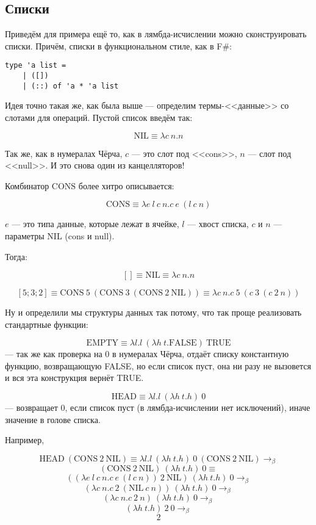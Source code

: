 \documentclass[a5paper]{article}
\begin{document}
\subsection{Списки}

Приведём для примера ещё то, как в лямбда-исчислении можно сконструировать списки. Причём, списки в функциональном стиле, как в F\#:

\begin{verbatim}
type 'a list =
    | ([])
    | (::) of 'a * 'a list
\end{verbatim}

Идея точно такая же, как была выше --- определим термы-<<данные>> со слотами для операций. Пустой список введём так:

$$\mbox{NIL} \equiv \lambda c\ n.n$$

Так же, как в нумералах Чёрча, $c$ --- это слот под <<cons>>, $n$ --- слот под <<null>>. И это снова один из канцелляторов!

Комбинатор $\mbox{CONS}$ более хитро описывается: 

$$\mbox{CONS} \equiv \lambda e\ l\ c\ n.c\ e\ (l\ c\ n)$$

$e$ --- это типа данные, которые лежат в ячейке, $l$ --- хвост списка, $c$ и $n$ --- параметры NIL (cons и null).

Тогда:

$$[] \equiv \mbox{NIL} \equiv \lambda c\ n.n$$

$$[5; 3; 2] \equiv \mbox{CONS}\ 5\ (\mbox{CONS}\ 3\ (\mbox{CONS}\ 2\ \mbox{NIL})) \equiv \lambda c\ n.c\ 5\ (c\ 3\ (c\ 2\ n))$$

Ну и определили мы структуры данных так потому, что так проще реализовать стандартные функции:

$$\mbox{EMPTY} \equiv \lambda l.l\ (\lambda h\ t.\mbox{FALSE})\ \mbox{TRUE}$$
--- так же как проверка на 0 в нумералах Чёрча, отдаёт списку константную функцию, возвращающую FALSE, но если список пуст, она ни разу не вызовется и вся эта конструкция вернёт TRUE.

$$\mbox{HEAD} \equiv \lambda l.l\ (\lambda h\ t.h)\ 0$$
--- возвращает 0, если список пуст (в лямбда-исчислении нет исключений), иначе значение в голове списка.

Например,

$$\mbox{HEAD}\ (\mbox{CONS}\ 2\ \mbox{NIL}) \equiv \lambda l.l\ (\lambda h\ t.h)\ 0\ (\mbox{CONS}\ 2\ \mbox{NIL}) \rightarrow_\beta$$
$$    (\mbox{CONS}\ 2\ \mbox{NIL})\ (\lambda h\ t.h)\ 0 \equiv$$
$$    ((\lambda e\ l\ c\ n.c\ e\ (l\ c\ n))\ 2\ \mbox{NIL})\ (\lambda h\ t.h)\ 0 \rightarrow_\beta$$
$$    (\lambda c\ n.c\ 2\ (\mbox{NIL}\ c\ n))\ (\lambda h\ t.h)\ 0 \rightarrow_\beta$$
$$    (\lambda c\ n.c\ 2\ n)\ (\lambda h\ t.h)\ 0 \rightarrow_\beta$$
$$    (\lambda h\ t.h)\ 2\ 0 \rightarrow_\beta$$
$$    2$$
\end{document}
